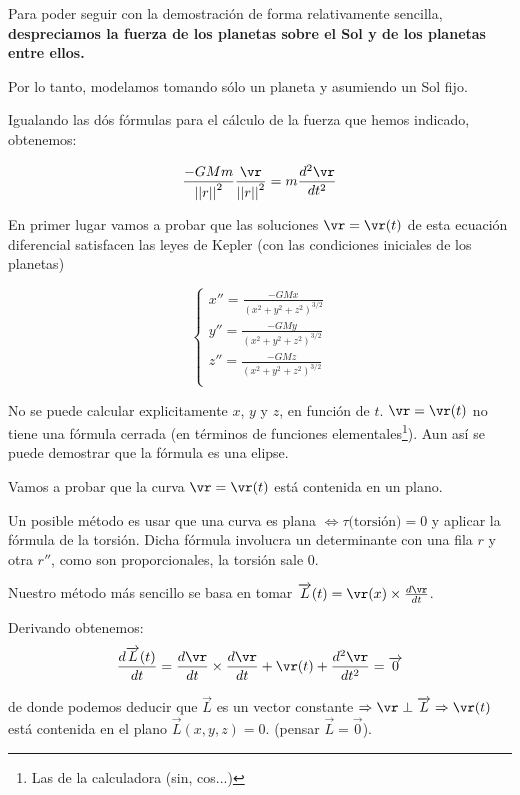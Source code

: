 Para poder seguir con la demostración de forma relativamente sencilla, \textbf{despreciamos la fuerza de los planetas sobre el Sol y de los planetas entre ellos.}

Por lo tanto, modelamos tomando sólo un planeta y asumiendo un Sol fijo.

Igualando las dós fórmulas para el cálculo de la fuerza que hemos indicado, obtenemos:

$$ \frac{-GMm}{{||r||}^2} \frac{\vr}{{||r||}^2}  =  m \frac{d^2\vr}{d t^2}$$


En primer lugar vamos a probar que las soluciones $\vr = \vr(t)$ de esta ecuación diferencial satisfacen las leyes de Kepler (con las condiciones iniciales de los planetas)

$$
\begin{cases}
 x'' = \frac{-GMx}{(x^2 + y^2 + z^2)^{3/2}}\\
 y'' = \frac{-GMy}{(x^2 + y^2 + z^2)^{3/2}}\\
 z'' = \frac{-GMz}{(x^2 + y^2 + z^2)^{3/2}}\\
\end{cases}
$$


 \begin{obs}
 No se puede calcular explicitamente $x$, $y$ y $z$, en función de $t$. $\vr = \vr(t)$ no tiene una fórmula cerrada (en términos de funciones elementales\footnote{Las de la calculadora (sin, cos...)}). Aun así se puede demostrar que la fórmula es una elipse.
 \end{obs}


Vamos a probar que la curva $\vr = \vr(t)$ está contenida en un plano.

Un posible método es usar que una curva es plana $\Leftrightarrow \tau \text{(torsión)} = 0$ y aplicar la fórmula de la torsión. Dicha fórmula involucra un determinante con una fila $r$ y otra $r''$, como son proporcionales, la torsión sale 0.


Nuestro método más sencillo se basa en tomar $\overrightarrow{L}(t) = \vr(x) \times \frac{d\vr}{dt}$.

Derivando obtenemos:
$$\frac{d\overrightarrow{L}(t)}{dt} = \frac{d\vr}{dt} \times \frac{d\vr}{dt} + \vr(t) + \frac{d^2\vr}{dt^2} = \overrightarrow{0}$$

de donde podemos deducir que $\overrightarrow{L}$ es un vector constante $\Rightarrow \vr \perp \overrightarrow{L} \Rightarrow \vr(t)$ está contenida en el plano $\overrightarrow{L}(x,y,z) = 0 $.
(pensar $\overrightarrow{L} = \overrightarrow{0}$).

